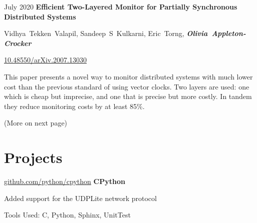 	\vspace{0.2 cm}

	\begin{samepage}
		\begin{twocolentry}
			{ July 2020 } \textbf{Efficient Two-Layered Monitor for Partially
			Synchronous Distributed Systems}
		\end{twocolentry}

		\vspace{0.10 cm}

		\begin{onecolentry}
			\mbox{Vidhya Tekken Valapil}, \mbox{Sandeep S Kulkarni}, \mbox{Eric Torng},
			\mbox{\textbf{\textit{Olivia Appleton-Crocker}}}

			\vspace{0.10 cm}

			\href{https://doi.org/10.48550/arXiv.2007.13030}{10.48550/arXiv.2007.13030} \vspace{0.1 cm}

			This paper presents a novel way to monitor distributed systems with much lower cost than the previous standard of using vector clocks. Two layers are used: one which is cheap but imprecise, and one that is precise but more costly. In tandem they reduce monitoring costs by at least 85\%.
		\end{onecolentry}
	\end{samepage}

	\vfill

	\begin{center}
		\footnotesize (More on next page) \normalsize
	\end{center}

	\newpage

	\section{Projects}

	\begin{samepage}
		\begin{twocolentry}
			{ \href{https://github.com/python/cpython}{github.com/python/cpython} } \textbf{CPython}
		\end{twocolentry}
	
		\begin{onecolentry}
			\begin{highlights}
				\item Added support for the UDPLite network protocol
				\item Tools Used: C, Python, Sphinx, UnitTest
			\end{highlights}
		\end{onecolentry}
	\end{samepage}

